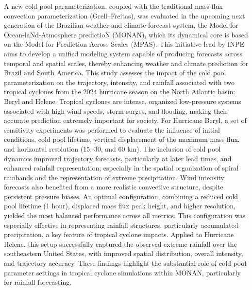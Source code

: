 
\begin{resumo}



A new cold pool parameterization, coupled with the traditional mass-flux convection parameterization (Grell–Freitas), was evaluated in the upcoming next generation of the Brazilian weather and climate forecast system, the Model for Ocean-laNd-Atmosphere predictioN (MONAN), which its dynamical core is based on the Model for Prediction Across Scales (MPAS). This initiative lead by INPE aims to develop a unified modeling system capable of producing forecasts across temporal and spatial scales, thereby enhancing weather and climate prediction for Brazil and South America. This study assesses the impact of the cold pool parameterization on the trajectory, intensity, and rainfall associated with two tropical cyclones from the 2024 hurricane season on the North Atlantic basin: Beryl and Helene. Tropical cyclones are intense, organized low-pressure systems associated with high wind speeds, storm surges, and flooding, making their accurate prediction extremely important for society. For Hurricane Beryl, a set of sensitivity experiments was performed to evaluate the influence of initial conditions, cold pool lifetime, vertical displacement of the maximum mass flux, and horizontal resolution (15, 30, and 60 km). The inclusion of cold pool dynamics improved trajectory forecasts, particularly at later lead times, and enhanced rainfall representation, especially in the spatial organization of spiral rainbands and the representation of extreme precipitation. Wind intensity forecasts also benefited from a more realistic convective structure, despite persistent pressure biases. An optimal configuration, combining a reduced cold pool lifetime (1 hour), displaced mass flux peak height, and higher resolution, yielded the most balanced performance across all metrics. This configuration was especially effective in representing rainfall structures, particularly accumulated precipitation, a key feature of tropical cyclone impacts. Applied to Hurricane Helene, this setup successfully captured the observed extreme rainfall over the southeastern United States, with improved spatial distribution, overall intensity, and trajectory accuracy. These findings highlight the substantial role of cold pool parameter settings in tropical cyclone simulations within MONAN, particularly for rainfall forecasting.

 
\end{resumo}